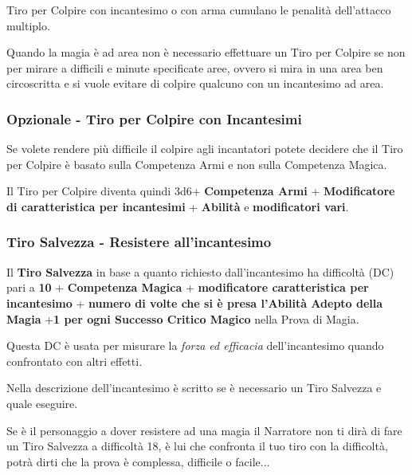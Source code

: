 \begin{multicols}{2}
Tiro per Colpire con incantesimo o con arma cumulano le penalità dell'attacco multiplo.

\medskip

Quando la magia è ad area non è necessario effettuare un Tiro per Colpire se non per mirare a difficili e minute specificate aree, ovvero si mira in una area ben circoscritta e si vuole evitare di colpire qualcuno con un incantesimo ad area. 

\subsubsection{Opzionale - Tiro per Colpire con Incantesimi}

Se volete rendere più difficile il colpire agli incantatori potete decidere che il Tiro per Colpire è basato sulla Competenza Armi e non sulla Competenza Magica.

Il Tiro per Colpire diventa quindi 3d6+ \textbf{Competenza Armi} + \textbf{Modificatore di caratteristica per incantesimi} + \textbf{Abilità} e \textbf{modificatori vari}.

\subsubsection{Tiro Salvezza - Resistere all'incantesimo}\label{magietirosalvezza}\hypertarget{magietirosalvezza}{}

Il \textbf{Tiro Salvezza} in base a quanto richiesto dall'incantesimo ha difficoltà (DC) pari a \textbf{10} + \textbf{Competenza Magica} + \textbf{modificatore caratteristica per incantesimo} + \textbf{numero di volte che si è presa l'Abilità Adepto della Magia} +\textbf{1 per ogni Successo Critico Magico} nella Prova di Magia.

Questa DC è usata per misurare la \emph{forza ed efficacia} dell'incantesimo quando confrontato con altri effetti.

Nella descrizione dell'incantesimo è scritto se è necessario un Tiro Salvezza e quale eseguire.

Se è il personaggio a dover resistere ad una magia il Narratore non ti dirà di fare un Tiro Salvezza a difficoltà 18, è lui che confronta il tuo tiro con la difficoltà, potrà dirti che la prova è complessa, difficile o facile...

\begin{itemize}[leftmargin=*] \setlength{\itemsep}{0pt}


\end{itemize}
\end{multicols}
